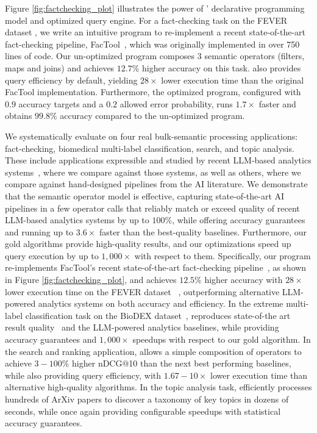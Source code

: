 

Figure \ref{fig:factchecking_plot} illustrates the power of \sys' declarative programming model and optimized query engine. For a fact-checking task on the FEVER dataset \cite{thorne_fever_2018},  we  write an intuitive \sys program to re-implement a recent state-of-the-art fact-checking pipeline, FacTool~\cite{chern_factool_2023}, which was originally implemented in over 750 lines of code. Our un-optimized \sys program composes $3$ semantic operators (filters, maps and joins)  and achieves  $12.7\%$ higher accuracy on this task. \sys also provides query efficiency by default, yielding $28\times$ lower execution time than the original FacTool implementation.
Furthermore, the optimized \sys program, configured with $0.9$ accuracy targets and a $0.2$  allowed error probability,  runs $1.7\times$ faster and obtains $99.8\%$ accuracy compared to the un-optimized \sys program.

We systematically evaluate \sys on four real bulk-semantic processing applications:  fact-checking, biomedical multi-label classification, search, and topic analysis. 
These include applications expressible and studied by recent LLM-based analytics systems~\cite{shankar_docetl_2024, dai_uqe_2024}, where we compare against those systems, as well as others, where we compare against hand-designed pipelines from the AI literature. 
We demonstrate that the semantic operator model is effective, capturing state-of-the-art AI pipelines in a few operator calls that reliably match or exceed quality of recent LLM-based analytics systems by up to $100\%$, while offering accuracy guarantees and running up to $3.6\times$ faster than the best-quality baselines. 
Furthermore, our gold algorithms provide high-quality results, and our optimizations speed up query execution by up to $1,000\times$ with respect to them.
Specifically, our \sys program re-implements FacTool's recent state-of-the-art fact-checking pipeline~\cite{chern_factool_2023}, as shown in Figure \ref{fig:factchecking_plot}, and achieves $12.5\%$ higher accuracy  with $28\times$  lower execution time on the FEVER dataset ~\cite{thorne_fever_2018}, outperforming alternative LLM-powered analytics systems on both accuracy and efficiency. In the extreme multi-label classification task on the BioDEX dataset~\cite{doosterlinck_biodex_2023}, \sys reproduces state-of-the art result quality~\cite{doosterlinck_-context_2024} and the LLM-powered analytics baselines, while providing  accuracy guarantees and $1,000\times$ speedups with respect to our gold algorithm. In the search and ranking application, \sys allows a simple composition of operators to achieve $3 -  100\%$ higher nDCG@10 than the next best performing baselines, while also providing query efficiency, with $1.67 - 10\times$ lower execution time than alternative high-quality algorithms. In the topic analysis task, \sys efficiently processes hundreds of ArXiv papers to discover a taxonomy of key topics in dozens of seconds, while once again providing configurable speedups with statistical accuracy guarantees.

